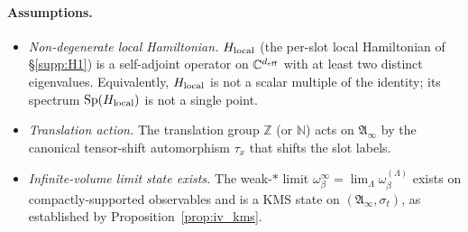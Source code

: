 \documentclass[11pt]{article}
\theoremstyle{plain}
\theoremstyle{definition}
\theoremstyle{remark}
\begin{document}
\paragraph{Assumptions.}
\begin{itemize}[leftmargin=2em,itemsep=2pt]
  \item[\textbf{(A1)}] \emph{Non-degenerate local Hamiltonian.}  $H_{\rm local}$ (the per-slot local Hamiltonian of \S\ref{supp:H1}) is a self-adjoint operator on $\mathbb{C}^{d_{\rm eff}}$ with at least two distinct eigenvalues.  Equivalently, $H_{\rm local}$ is not a scalar multiple of the identity; its spectrum $\mathrm{Sp}(H_{\rm local})$ is not a single point.
  \item[\textbf{(A2)}] \emph{Translation action.}  The translation group $\mathbb{Z}$ (or $\mathbb{N}$) acts on $\mathfrak{A}_\infty$ by the canonical tensor-shift automorphism $\tau_x$ that shifts the slot labels.
  \item[\textbf{(A3)}] \emph{Infinite-volume limit state exists.}  The weak-$\ast$ limit $\omega_\beta^\infty = \lim_\Lambda \omega_\beta^{(\Lambda)}$ exists on compactly-supported observables and is a KMS state on $(\mathfrak{A}_\infty, \sigma_t)$, as established by Proposition~\ref{prop:iv_kms}.
\end{itemize}
\end{document}
